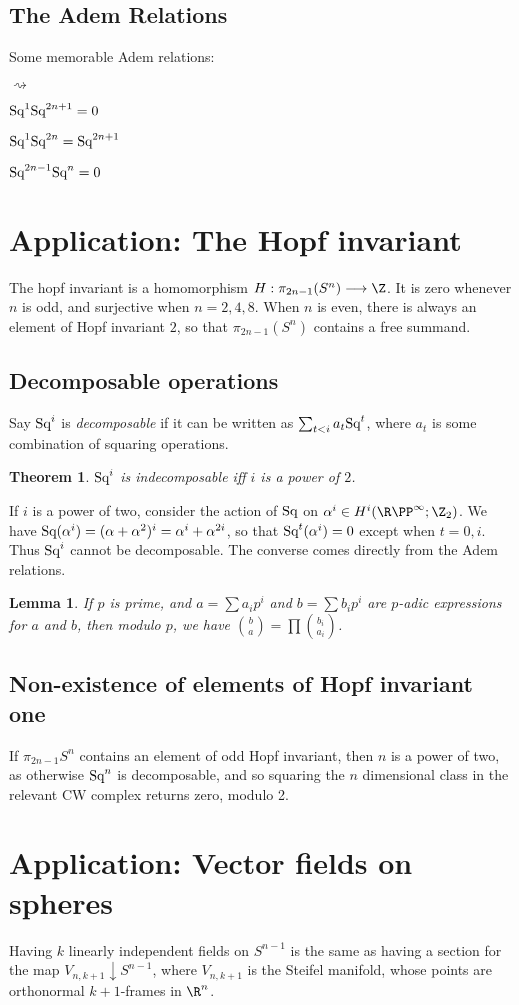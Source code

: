 \documentclass[11pt]{article}
\newcommand{\Squ}{\textup{Sq}}
\theoremstyle{plain}
\newtheorem*{thm*}{Theorem}
\newtheorem*{lem*}{Lemma}
\theoremstyle{definition}
\renewcommand{\to}{\longrightarrow}
\newcommand{\RP}{{\R\PP}}
\newenvironment{itemise}{
\begin{list}{\textup{$\rightsquigarrow$}}
   {
      \setlength{\topsep}{.1cm}
      \setlength{\itemsep}{1pt}
      \setlength{\parskip}{0pt}
      \setlength{\parsep}{0pt}
   }
}{\end{list}\vspace{-.2cm}}
\begin{document}
\subsection{The Adem Relations}
Some memorable Adem relations:
\begin{itemise}
\item $\Squ^1\Squ^{2n+1}=0$
\item $\Squ^1\Squ^{2n}=\Squ^{2n+1}$
\item $\Squ^{2n-1}\Squ^{n}=0$
\end{itemise}
\section{Application: The Hopf invariant}
The hopf invariant is a homomorphism $H:\pi_{2n-1}(S^n)\to\Z$. It is zero whenever $n$ is odd, and surjective when $n=2,4,8$. When $n$ is even, there is always an element of Hopf invariant $2$, so that $\pi_{2n-1}(S^n)$ contains a free summand.
\setcounter{subsection}{1}
\subsection{Decomposable operations}
Say $\Squ^i$ is \emph{decomposable} if it can be written as $\sum_{t<i}a_t\Squ^t$, where $a_t$ is some combination of squaring operations.
\begin{thm*}
$\Squ^i$ is indecomposable iff $i$ is a power of $2$.
\end{thm*}
If $i$ is a power of two, consider the action of $\Squ$ on $\alpha^i\in H^i(\RP^\infty;\Z_2)$. We have $\Squ(\alpha^i)=(\alpha+\alpha^2)^i=\alpha^i+\alpha^{2i}$, so that $\Squ^t(\alpha^i)=0$ except when $t=0,i$. Thus $\Squ^i$ cannot be decomposable. The converse comes directly from the Adem relations.
\begin{lem*}
If $p$ is prime, and $a=\sum a_ip^i$ and $b=\sum b_ip^i$ are $p$-adic expressions for $a$ and $b$, then modulo $p$, we have ${b\choose a}=\prod{b_i\choose a_i}$.
\end{lem*}
\subsection{Non-existence of elements of Hopf invariant one}
If $\pi_{2n-1}S^n$ contains an element of odd Hopf invariant, then $n$ is a power of two, as otherwise $\Squ^n$ is decomposable, and so squaring the $n$ dimensional class in the relevant CW complex returns zero, modulo 2.

\section{Application: Vector fields on spheres}
Having $k$ linearly independent fields on $S^{n-1}$ is the same as having a section for the map $V_{n,k+1}\downarrow S^{n-1}$, where $V_{n,k+1}$ is the Steifel manifold, whose points are orthonormal $k+1$-frames in $\R^n$. 
\end{document}
